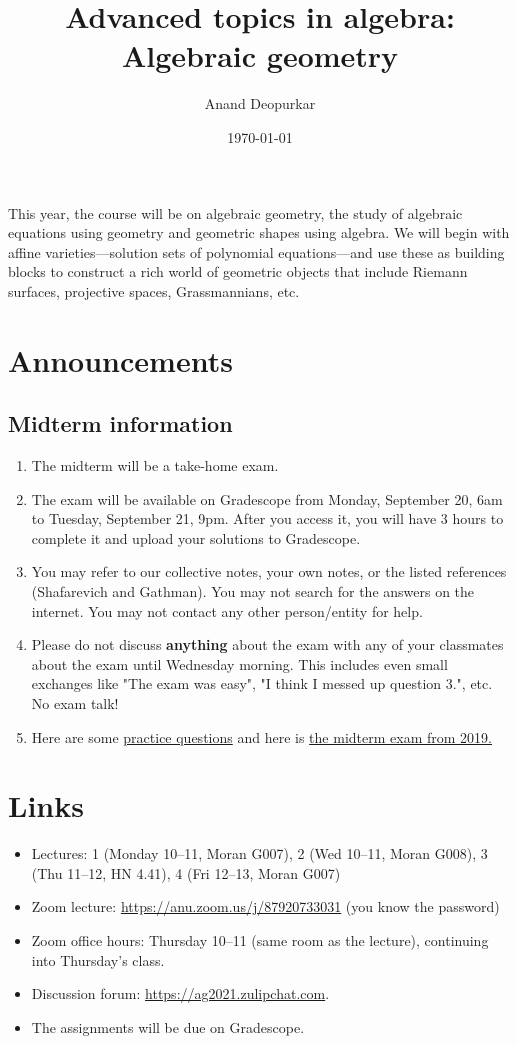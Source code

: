 \documentclass[11pt]{article}
\author{Anand Deopurkar}
\date{\today}
\title{Advanced topics in algebra: Algebraic geometry}
\begin{document}
\maketitle
This year, the course will be on algebraic geometry, the study of algebraic equations using geometry and geometric shapes using algebra.
We will begin with affine varieties---solution sets of polynomial equations---and use these as building blocks to construct a rich world of geometric objects that include Riemann surfaces, projective spaces, Grassmannians, etc.

\section{Announcements}
\label{sec:org102ffc2}
\subsection{Midterm information}
\label{sec:org099b9ad}
\begin{enumerate}
\item The midterm will be a take-home exam.
\item The exam will be available on Gradescope from Monday, September 20, 6am to Tuesday, September 21, 9pm.  After you access it, you will have 3 hours to complete it and upload your solutions to Gradescope.
\item You may refer to our collective notes, your own notes, or the listed references (Shafarevich and Gathman).  You may not search for the answers on the internet.  You may not contact any other person/entity for help.
\item Please do not discuss \textbf{anything} about the exam with any of your classmates about the exam until Wednesday morning.  This includes even small exchanges like "The exam was easy", "I think I messed up question 3.", etc. No exam talk!
\item Here are some \href{AGMidtermPractice.pdf}{practice questions} and here is \href{midterm2019.pdf}{the midterm exam from 2019.}
\end{enumerate}

\section{Links}
\label{sec:orgd3caaeb}
\begin{itemize}
\item Lectures: 1 (Monday 10--11, Moran G007), 2 (Wed 10--11, Moran G008), 3 (Thu 11--12, HN 4.41), 4 (Fri 12--13, Moran G007)
\item Zoom lecture: \url{https://anu.zoom.us/j/87920733031} (you know the password)
\item Zoom office hours: Thursday 10--11 (same room as the lecture), continuing into Thursday's class.
\item Discussion forum: \url{https://ag2021.zulipchat.com}.
\item The assignments will be due on Gradescope.
\end{itemize}
\end{document}
